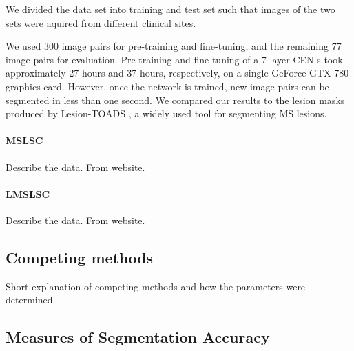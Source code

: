 
We divided the data set into training and test set such that images of the two
sets were aquired from different clinical sites.

We used 300 image pairs for pre-training and fine-tuning, and the remaining 77
image pairs for evaluation. Pre-training and fine-tuning of a 7-layer CEN-s took
approximately 27 hours and 37 hours, respectively, on a single GeForce GTX 780
graphics card. However, once the network is trained, new image pairs can be
segmented in less than one second. We compared our results to the lesion masks
produced by Lesion-TOADS \cite{shiee2010topology}, a widely used tool for
segmenting MS lesions.

\paragraph{MSLSC}
Describe the data. From website.

\paragraph{LMSLSC}
Describe the data. From website.

\subsection{Competing methods}

Short explanation of competing methods and how the parameters were determined.

\subsection{Measures of Segmentation Accuracy}



